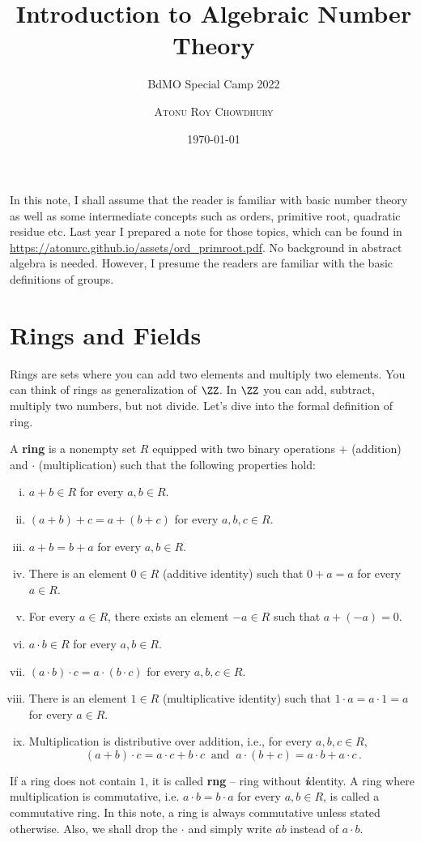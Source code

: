 \documentclass[11pt]{scrartcl}
\begin{document}
\title{Introduction to Algebraic Number Theory}
\subtitle{BdMO Special Camp 2022}
\author{\scshape{Atonu Roy Chowdhury} \\
}
\date{\today}
\maketitle

In this note, I shall assume that the reader is familiar with basic number theory as well as some intermediate concepts such as orders, primitive root, quadratic residue etc. Last year I prepared a note for those topics, which can be found in \url{https://atonurc.github.io/assets/ord_primroot.pdf}. No background in abstract algebra is needed. However, I presume the readers are familiar with the basic definitions of groups.

\section{Rings and Fields}
Rings are sets where you can add two elements and multiply two elements. You can think of rings as generalization of \(\ZZ\). In \(\ZZ\) you can add, subtract, multiply two numbers, but not divide. Let's dive into the formal definition of ring.
\begin{defn}[Ring]
A \textbf{ring} is a nonempty set \(R\) equipped with two binary operations \(+\) (addition) and \(\cdot\) (multiplication) such that the following properties hold:
\begin{enumerate}[(i)]
    \item \(a+b \in R\) for every \(a,b \in R\).
    \item \((a+b)+c = a+(b+c)\) for every \(a,b,c \in R\).
    \item \(a+b = b+a\) for every \(a,b \in R\).
    \item There is an element \(0 \in R\) (additive identity) such that \(0+a = a\) for every \(a\in R\).
    \item For every \(a \in R\), there exists an element \(-a \in R\) such that \(a+(-a) = 0\).
    \item \(a \cdot b \in R\) for every \(a,b \in R\).
    \item \((a\cdot b)\cdot c = a\cdot (b\cdot c)\) for every \(a,b,c \in R\).
    \item There is an element \(1 \in R\) (multiplicative identity) such that \(1 \cdot a = a \cdot 1 = a\) for every \(a \in R\).
    \item Multiplication is distributive over addition, i.e., for every \(a,b,c\in R\),
    \[ (a+b) \cdot c = a \cdot c + b \cdot c \ \text{ and } \ a \cdot \left(b + c\right) = a \cdot b + a \cdot c \,.  \]
\end{enumerate}
\end{defn}
If a ring does not contain \(1\), it is called \textbf{rng} -- ring without \textit{\textbf{i}}dentity. A ring where multiplication is commutative, i.e. \(a \cdot b = b \cdot a\) for every \(a,b \in R\), is called a commutative ring. In this note, a ring is always commutative unless stated otherwise. Also, we shall drop the \(\cdot\) and simply write \(ab\) instead of \(a \cdot b\).
\end{document}
